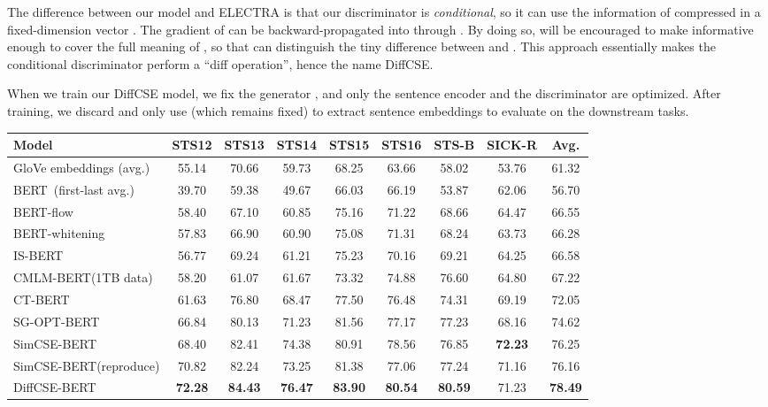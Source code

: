 \documentclass[11pt]{article}
\newcommand{\diffcse}{DiffCSE\xspace}
\newcommand{\ba}{\xspace}
\newcommand\tf[1]{\textbf{#1}}
\begin{document}
The difference between our model and ELECTRA is that our discriminator  is \emph{conditional}, so it can use the information of  compressed in a fixed-dimension vector . The gradient of  can be backward-propagated into  through . By doing so,  will be encouraged to make  informative enough to cover the full meaning of , so that  can distinguish the tiny difference between  and . This approach essentially makes the conditional discriminator perform a ``diff operation'', hence the name DiffCSE.

When we train our \diffcse model, we fix the generator , and only the sentence encoder  and the discriminator  are optimized. After training, we discard  and only use  (which remains fixed) to extract sentence embeddings to evaluate on the downstream tasks.

\begin{table*}[th!]
    \begin{center}
    \centering
    \small
    \begin{tabular}{lcccccccc}
    \toprule
       \tf{Model} & \tf{STS12} & \tf{STS13} & \tf{STS14} & \tf{STS15} & \tf{STS16} & \tf{STS-B} & \tf{SICK-R} & \tf{Avg.} \\
    \midrule
        GloVe embeddings (avg.) & 55.14 & 70.66 & 59.73 & 68.25 & 63.66 & 58.02 & 53.76 & 61.32 \\
        BERT\ba~(first-last avg.) & 39.70&	59.38&	49.67&	66.03&	66.19&	53.87&	62.06&	56.70\\
        BERT\ba-flow & 58.40&	67.10&	60.85&	75.16&	71.22&	68.66&	64.47&	66.55 \\ 
        BERT\ba-whitening & 57.83& 66.90 & 60.90 & 75.08& 71.31& 68.24& 63.73& 66.28\\ 
        IS-BERT\ba & 56.77 & 69.24 & 61.21 & 75.23 & 70.16 & 69.21 & 64.25 & 66.58 \\
        CMLM-BERT\ba {\scriptsize(1TB data)} & 58.20 & 61.07 & 61.67 & 73.32 & 74.88 & 76.60 & 64.80 & 67.22 \\
        CT-BERT\ba & 61.63 & 76.80 & 68.47 & 77.50 & 76.48 & 74.31 & 69.19 &72.05 \\
        SG-OPT-BERT\ba & 66.84 & 80.13 & 71.23 & 81.56 & 77.17 & 77.23 & 68.16 & 74.62 \\
        SimCSE-BERT\ba &  68.40 & 82.41  & 74.38 & 80.91 & 78.56 & 76.85 & \bf 72.23 & 76.25 \\
         SimCSE-BERT\ba {\scriptsize(reproduce)} & 70.82 & 82.24 & 73.25 & 81.38 & 77.06 & 77.24 & 71.16 & 76.16 \\
         DiffCSE-BERT\ba & \bf 72.28 & \bf 84.43 & \bf 76.47 & \bf 83.90 & \bf 80.54 & \bf 80.59 & 71.23 & \bf 78.49 \\

\end{tabular}
\end{center}
\end{table*}
\end{document}
